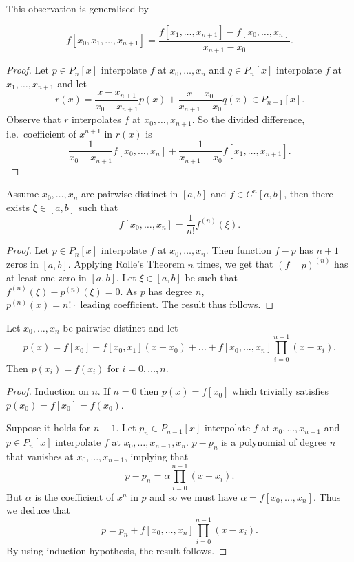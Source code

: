 \documentclass[a4paper]{article}
\begin{document}
This observation is generalised by

\begin{theorem}
  \[
    f[x_0, x_1, \dots, x_{n + 1}] = \frac{f[x_1, \dots, x_{n + 1}] - f[x_0, \dots, x_n]}{x_{n + 1} - x_0}.
  \]
\end{theorem}

\begin{proof}
  Let \(p \in P_n[x]\) interpolate \(f\) at \(x_0, \dots, x_n\) and \(q \in P_n[x]\) interpolate \(f\) at \(x_1, \dots, x_{n + 1}\) and let
  \[
    r(x) = \frac{x - x_{n + 1}}{x_0 - x_{n + 1}}p(x) + \frac{x - x_0}{x_{n + 1} - x_0}q(x) \in P_{n + 1}[x].
  \]
  Observe that \(r\) interpolates \(f\) at \(x_0, \dots, x_{n + 1}\). So the divided difference, i.e.\ coefficient of \(x^{n + 1}\) in \(r(x)\) is
  \[
    \frac{1}{x_0 - x_{n + 1}}f[x_0, \dots, x_n] + \frac{1}{x_{n + 1} - x_0}f[x_1, \dots, x_{n + 1}].
  \]
\end{proof}

\begin{theorem}
  Assume \(x_0, \dots, x_n\) are pairwise distinct in \([a, b]\) and \(f \in C^n[a, b]\), then there exists \(\xi \in [a, b]\) such that
  \[
    f[x_0, \dots, x_n] = \frac{1}{n!}f^{(n)}(\xi).
  \]
\end{theorem}

\begin{proof}
  Let \(p \in P_n[x]\) interpolate \(f\) at \(x_0, \dots, x_n\). Then function \(f - p\) has \(n + 1\) zeros in \([a, b]\). Applying Rolle's Theorem \(n\) times, we get that \((f - p)^{(n)}\) has at least one zero in \([a, b]\). Let \(\xi \in [a, b]\) be such that \(f^{(n)}(\xi) - p^{(n)}(\xi) = 0\). As \(p\) has degree \(n\), \(p^{(n)}(x) = n! \cdot \text{ leading coefficient}\). The result thus follows.
\end{proof}

\begin{theorem}
  Let \(x_0, \dots, x_n\) be pairwise distinct and let
  \[
    p(x) = f[x_0] + f[x_0, x_1](x - x_0) + \dots + f[x_0, \dots, x_n]\prod_{i = 0}^{n - 1}(x - x_i).
  \]
  Then \(p(x_i) = f(x_i)\) for \(i = 0, \dots, n\).
\end{theorem}

\begin{proof}
  Induction on \(n\). If \(n = 0\) then \(p(x) = f[x_0]\) which trivially satisfies \(p(x_0) = f[x_0] = f(x_0)\).

  Suppose it holds for \(n - 1\). Let \(p_n \in P_{n - 1}[x]\) interpolate \(f\) at \(x_0, \dots, x_{n - 1}\) and \(p \in P_n[x]\) interpolate \(f\) at \(x_0, \dots, x_{n - 1}, x_n\). \(p - p_n\) is a polynomial of degree \(n\) that vanishes at \(x_0, \dots, x_{n - 1}\), implying that
  \[
    p - p_n = \alpha \prod_{i = 0}^{n - 1}(x - x_i).
  \]
  But \(\alpha\) is the coefficient of \(x^n\) in \(p\) and so we must have \(\alpha = f[x_0, \dots, x_n]\). Thus we deduce that
  \[
    p = p_n + f[x_0, \dots, x_n] \prod_{i = 0}^{n - 1}(x - x_i).
  \]
  By using induction hypothesis, the result follows.
\end{proof}
\end{document}
